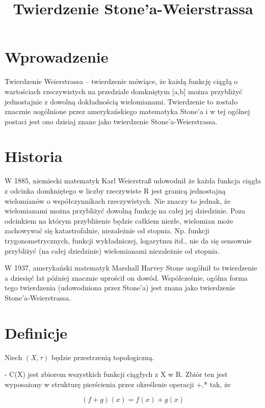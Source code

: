 \documentclass{article}
\begin{document}
\title{Twierdzenie Stone’a-Weierstrassa}
\maketitle

\section*{Wprowadzenie}
Twierdzenie Weierstrassa – twierdzenie mówiące, że każdą funkcję ciągłą o wartościach rzeczywistych na przedziale domkniętym [a,b] można przybliżyć jednostajnie z dowolną dokładnością wielomianami. Twierdzenie to zostało znacznie uogólnione przez amerykańskiego matematyka Stone’a i w tej ogólnej postaci jest ono dzisiaj znane jako twierdzenie Stone’a-Weierstrassa.  

\section*{Historia}

W 1885, niemiecki matematyk Karl Weierstraß udowodnił że każda funkcja ciągła z odcinka domkniętego w liczby rzeczywiste R jest granicą jednostajną wielomianów o współczynnikach rzeczywistych. Nie znaczy to jednak, że wielomianami można przybliżyć dowolną funkcję na całej jej dziedzinie. Poza odcinkiem na którym przybliżenie będzie całkiem niezłe, wielomian może zachowywać się katastrofalnie, niezależnie od stopnia. Np. funkcji trygonometrycznych, funkcji wykładniczej, logarytmu itd., nie da się sensownie przybliżyć (na całej dziedzinie) wielomianami niezależnie od stopnia.

W 1937, amerykański matematyk Marshall Harvey Stone uogólnił to twierdzenie a dziesięć lat później znacznie uprościł on dowód. Współcześnie, ogólna forma tego twierdzenia (udowodniona przez Stone’a) jest znana jako twierdzenie Stone’a-Weierstrassa. 

\section*{Definicje}
Niech $(X,\tau)$ będzie przestrzenią topologiczną.

- C(X) jest zbiorem wszystkich funkcji ciągłych z X w R. Zbiór ten jest wyposażony w strukturę pierścienia przez określenie operacji +,* tak, że

\begin{displaymath}
	(f+g)(x)=f(x)+g(x)
\end{displaymath}
\end{document}
